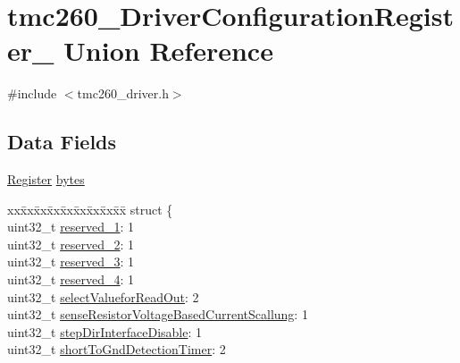 \hypertarget{uniontmc260___driver_configuration_register__}{}\section{tmc260\+\_\+\+Driver\+Configuration\+Register\+\_\+ Union Reference}
\label{uniontmc260___driver_configuration_register__}


{\ttfamily \#include $<$tmc260\+\_\+driver.\+h$>$}

\subsection*{Data Fields}
\begin{DoxyCompactItemize}
\item 
\mbox{\hyperlink{tmc260__driver_8h_a280b01a3b5bb4294fcee278b00c030d6}{Register}} \mbox{\hyperlink{uniontmc260___driver_configuration_register___a445b72174063a88455cd86c22d77d03f}{bytes}}
\item 
\begin{tabbing}
xx\=xx\=xx\=xx\=xx\=xx\=xx\=xx\=xx\=\kill
struct \{\\
\>uint32\_t \mbox{\hyperlink{uniontmc260___driver_configuration_register___aa5d9ea4624bf97017a821a70177c6bdb}{reserved\_1}}: 1\\
\>uint32\_t \mbox{\hyperlink{uniontmc260___driver_configuration_register___a50b223df92282d04dfa46306b53a9905}{reserved\_2}}: 1\\
\>uint32\_t \mbox{\hyperlink{uniontmc260___driver_configuration_register___af8407645db2d0329264f3c6d0cbd6dd1}{reserved\_3}}: 1\\
\>uint32\_t \mbox{\hyperlink{uniontmc260___driver_configuration_register___aaf2eb7a7615ec891d7e5a9d49d433f37}{reserved\_4}}: 1\\
\>uint32\_t \mbox{\hyperlink{uniontmc260___driver_configuration_register___a435dbdfe64b7725036f42c7a43e484d9}{selectValueforReadOut}}: 2\\
\>uint32\_t \mbox{\hyperlink{uniontmc260___driver_configuration_register___a1514fb7fe4707a427681e57450ecc165}{senseResistorVoltageBasedCurrentScallung}}: 1\\
\>uint32\_t \mbox{\hyperlink{uniontmc260___driver_configuration_register___a912e153026c0015a0a66ceb21633866b}{stepDirInterfaceDisable}}: 1\\
\>uint32\_t \mbox{\hyperlink{uniontmc260___driver_configuration_register___a8a95d7b0645afa6ac70bdc82e735790d}{shortToGndDetectionTimer}}: 2\\

\end{tabbing}
\end{DoxyCompactItemize}

